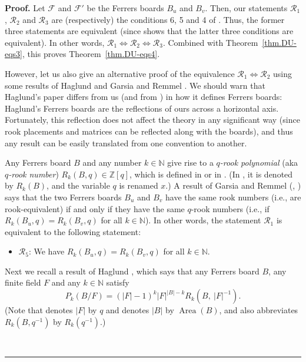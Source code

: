 \documentclass[numbers=enddot,12pt,final,onecolumn,notitlepage]{scrartcl}%
\theoremstyle{definition}
\newenvironment{proof}[1][Proof]{\noindent\textbf{#1.} }{\ \rule{0.5em}{0.5em}}
\newcommand{\NN}{\mathbb{N}}
\newcommand{\ZZ}{\mathbb{Z}}
\newenvironment{verlong}{}{}
\begin{document}
\begin{verlong}
\begin{proof}
Let $\mathcal{F}$ and $\mathcal{F}'$ be the Ferrers boards $B_u$ and $B_v$.
Then, our statements $\mathcal{R}_1$, $\mathcal{R}_2$ and $\mathcal{R}_3$ are (respectively) the conditions 6, 5 and 4 of \cite[Corollary 3.2]{CoGrRa23}.
Thus, the former three statements are equivalent (since \cite[Corollary 3.2]{CoGrRa23} shows that the latter three conditions are equivalent).
In other words,
$\mathcal{R}_1 \Longleftrightarrow \mathcal{R}_2 \Longleftrightarrow \mathcal{R}_3$.
Combined with Theorem~\ref{thm.DU-eqs3}, this proves Theorem~\ref{thm.DU-eqs4}.

However, let us also give an alternative proof of the equivalence
$\mathcal{R}_1\Longleftrightarrow\mathcal{R}_2$ using some results of
Haglund \cite{Haglun98} and Garsia and Remmel
\cite{GarRem86}. We should warn that Haglund's paper \cite{Haglun98} differs
from us (and from \cite{GarRem86}) in how it defines Ferrers boards: Haglund's
Ferrers boards are the reflections of ours across a horizontal axis.
Fortunately, this reflection does not affect the theory in any significant way
(since rook placements and matrices can be reflected along with the boards),
and thus any result can be easily translated from one convention to another.

Any Ferrers board $B$ and any number $k \in \NN$ give rise to a $q$\emph{-rook polynomial} (aka $q$\emph{-rook
number}) $R_{k}\left(  B,q\right)  \in\ZZ\left[  q\right]  $,
which is defined in \cite[(I.4)]{GarRem86} or in \cite[(1)]{Haglun98}.
(In \cite[(1)]{Haglun98}, it is denoted by $R_{k}\left(  B\right)  $, and the
variable $q$ is renamed $x$.) A result of Garsia and Remmel (\cite[last
paragraph of \S 1]{GarRem86}, \cite[between (2) and (3)]{Haglun98}) says that
the two Ferrers boards $B_{u}$ and $B_{v}$ have the same rook numbers (i.e.,
are rook-equivalent) if and only if they have the same $q$-rook numbers (i.e.,
if $R_{k}\left(  B_{u},q\right)  =R_{k}\left(  B_{v},q\right)  $ for all
$k\in\NN$). In other words, the statement $\mathcal{R}_1$ is
equivalent to the following statement:

\begin{itemize}
\item $\mathcal{R}_5$: We have $R_{k}\left(  B_{u},q\right)  =R_{k}\left(
B_{v},q\right)  $ for all $k\in\NN$.
\end{itemize}

Next we recall a result of Haglund \cite[Theorem 1]{Haglun98}, which says that
any Ferrers board $B$, any finite
field $F$ and any $k\in\NN$ satisfy
\begin{equation}
P_{k}\left(  B/F\right)  =\left(  \left\vert F\right\vert -1\right)
^{k}\left\vert F\right\vert ^{\left\vert B\right\vert -k}R_{k}\left(
B,\ \left\vert F\right\vert ^{-1}\right)  .\label{pf.thm.DU-eqs4.hag}%
\end{equation}
(Note that \cite{Haglun98} denotes $\left\vert F\right\vert $ by $q$ and
denotes $\left\vert B\right\vert $ by $\operatorname*{Area}\left(  B\right)
$, and also abbreviates $R_{k}\left(  B,q^{-1}\right)  $ by $R_{k}\left(
q^{-1}\right)  $.)


\end{proof}
\end{verlong}
\end{document}
